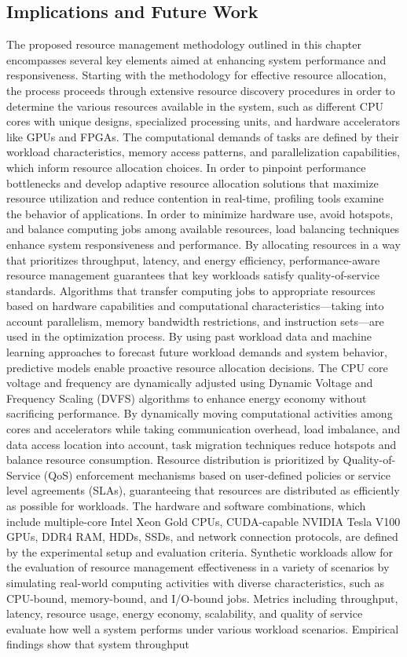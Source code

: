 \documentclass[16pt,a4paper]{article}
\begin{document}
\subsection{Implications and Future Work}
The proposed resource management methodology outlined in this chapter encompasses several key elements aimed at enhancing system performance and responsiveness. Starting with the methodology for effective resource allocation, the process proceeds through extensive resource discovery procedures in order to determine the various resources available in the system, such as different CPU cores with unique designs, specialized processing units, and hardware accelerators like GPUs and FPGAs. The computational demands of tasks are defined by their workload characteristics, memory access patterns, and parallelization capabilities, which inform resource allocation choices. In order to pinpoint performance bottlenecks and develop adaptive resource allocation solutions that maximize resource utilization and reduce contention in real-time, profiling tools examine the behavior of applications. In order to minimize hardware use, avoid hotspots, and balance computing jobs among available resources, load balancing techniques enhance system responsiveness and performance. By allocating resources in a way that prioritizes throughput, latency, and energy efficiency, performance-aware resource management guarantees that key workloads satisfy quality-of-service standards. Algorithms that transfer computing jobs to appropriate resources based on hardware capabilities and computational characteristics—taking into account parallelism, memory bandwidth restrictions, and instruction sets—are used in the optimization process. By using past workload data and machine learning approaches to forecast future workload demands and system behavior, predictive models enable proactive resource allocation decisions. The CPU core voltage and frequency are dynamically adjusted using Dynamic Voltage and Frequency Scaling (DVFS) algorithms to enhance energy economy without sacrificing performance. By dynamically moving computational activities among cores and accelerators while taking communication overhead, load imbalance, and data access location into account, task migration techniques reduce hotspots and balance resource consumption. Resource distribution is prioritized by Quality-of-Service (QoS) enforcement mechanisms based on user-defined policies or service level agreements (SLAs), guaranteeing that resources are distributed as efficiently as possible for workloads. The hardware and software combinations, which include multiple-core Intel Xeon Gold CPUs, CUDA-capable NVIDIA Tesla V100 GPUs, DDR4 RAM, HDDs, SSDs, and network connection protocols, are defined by the experimental setup and evaluation criteria. Synthetic workloads allow for the evaluation of resource management effectiveness in a variety of scenarios by simulating real-world computing activities with diverse characteristics, such as CPU-bound, memory-bound, and I/O-bound jobs. Metrics including throughput, latency, resource usage, energy economy, scalability, and quality of service evaluate how well a system performs under various workload scenarios. Empirical findings show that system throughput 
\end{document}
